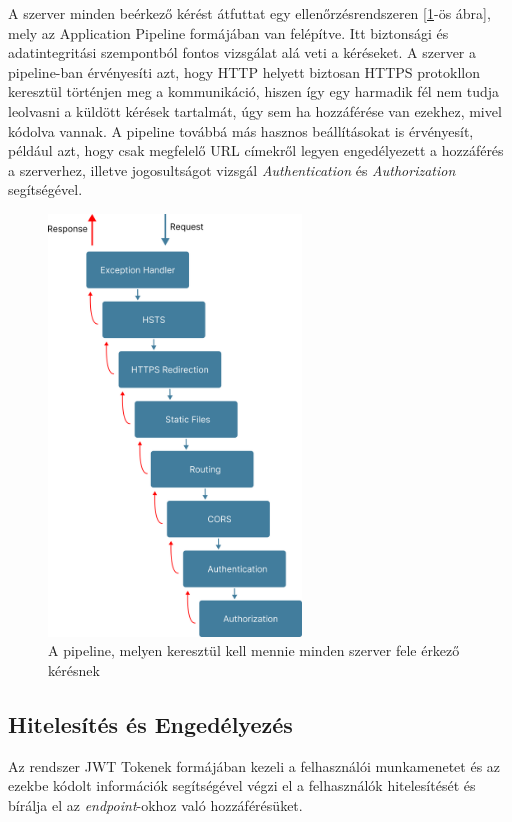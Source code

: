 A szerver minden beérkező kérést átfuttat egy ellenőrzésrendszeren [\ref{fig:pipeline}-ös ábra], mely az Application Pipeline formájában van felépítve. Itt biztonsági és adatintegritási szempontból fontos vizsgálat alá veti a kéréseket. A szerver a pipeline-ban érvényesíti azt, hogy HTTP helyett biztosan HTTPS protokllon keresztül történjen meg a kommunikáció, hiszen így egy harmadik fél nem tudja leolvasni a küldött kérések tartalmát, úgy sem ha hozzáférése van ezekhez, mivel kódolva vannak. A pipeline továbbá más hasznos beállításokat is érvényesít, például azt, hogy csak megfelelő URL címekről legyen engedélyezett a hozzáférés a szerverhez, illetve jogosultságot vizsgál \textit{Authentication} és \textit{Authorization} segítségével.

\begin{figure}[h]
    \centering
    \includegraphics[width=0.6\textwidth]{./images/pipeline.png}
    \caption{A pipeline, melyen keresztül kell mennie minden szerver fele érkező kérésnek}
    \label{fig:pipeline}
\end{figure}

\subsection{Hitelesítés és Engedélyezés}

Az rendszer JWT Tokenek formájában kezeli a felhasználói munkamenetet és az ezekbe kódolt információk segítségével végzi el a felhasználók hitelesítését és bírálja el az \textit{endpoint}-okhoz való hozzáférésüket.

